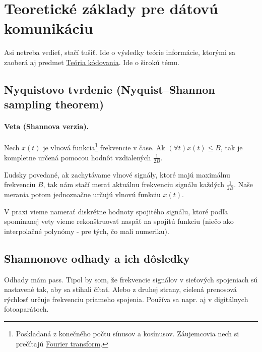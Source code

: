 \documentclass[10pt,a4paper]{article}
\begin{document}
\section{Teoretické základy pre dátovú komunikáciu} 

Asi netreba vedieť, stačí tušiť. Ide o výsledky teórie informácie, ktorými sa zaoberá aj predmet \href{http://www.dcs.fmph.uniba.sk/texty/codebook.pdf}{Teória kódovania}. Ide o širokú tému. 

\subsection{Nyquistovo tvrdenie (Nyquist–Shannon sampling theorem)}             

\paragraph{Veta (Shannova verzia).} Nech $x(t)$ je vlnová funkcia\footnote{
Poskladaná z konečného počtu sínusov a kosínusov. Záujemcovia nech si prečítajú \href{http://en.wikipedia.org/wiki/Fourier_transform}{Fourier transform}.
} frekvencie v čase. Ak $(\forall t)x(t)\leq B$, tak je kompletne určená pomocou hodnôt vzdialených $\frac{1}{2B}$.

Ľudsky povedané, ak zachytávame vlnové signály, ktoré majú maximálnu frekvenciu $B$, tak nám stačí merať aktuálnu frekvenciu signálu každých $\frac{1}{2B}$. Naše merania potom jednoznačne určujú vlnovú funkciu $x(t)$.

V praxi vieme namerať diskrétne hodnoty spojitého signálu, ktoré podľa spomínanej vety vieme rekonštruovať naspäť na spojitú funkciu (niečo ako interpolačné polynómy - pre tých, čo mali numeriku). 
  
\subsection{Shannonove odhady a ich dôsledky}  
Odhady mám pass. 
Tipol by som, že frekvencie signálov v sieťových spojeniach sú nastavené tak, aby sa stíhali čítať. Alebo z druhej strany, cielená prenosová rýchlosť určuje frekvenciu priameho spojenia. 
Používa sa napr. aj v digitálnych fotoaparátoch. 


\end{document}
